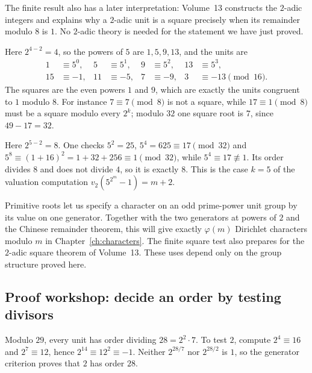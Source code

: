 The finite result also has a later interpretation: Volume~13 constructs the $2$-adic integers and explains why a $2$-adic unit is a square precisely when its remainder modulo $8$ is $1$. No $2$-adic theory is needed for the statement we have just proved.

\begin{examplex}
Here $2^{4-2}=4$, so the powers of $5$ are $1,5,9,13$, and the units are
\[
\begin{aligned}
1&\equiv5^0,&5&\equiv5^1,&9&\equiv5^2,&13&\equiv5^3,\\
15&\equiv-1,&11&\equiv-5,&7&\equiv-9,&3&\equiv-13\pmod{16}.
\end{aligned}
\]
The squares are the even powers $1$ and $9$, which are exactly the units congruent to $1$ modulo $8$. For instance $7\equiv7\pmod8$ is not a square, while $17\equiv1\pmod8$ must be a square modulo every $2^k$; modulo $32$ one square root is $7$, since $49-17=32$.
\end{examplex}

\begin{examplex}
Here $2^{5-2}=8$. One checks $5^2=25$, $5^4=625\equiv17\pmod{32}$ and $5^8\equiv(1+16)^2=1+32+256\equiv1\pmod{32}$, while $5^4\equiv17\not\equiv1$. Its order divides $8$ and does not divide $4$, so it is exactly $8$. This is the case $k=5$ of the valuation computation $v_2(5^{2^m}-1)=m+2$.
\end{examplex}

\begin{beauty}
Primitive roots let us specify a character on an odd prime-power unit group by its value on one generator. Together with the two generators at powers of $2$ and the Chinese remainder theorem, this will give exactly $\varphi(m)$ Dirichlet characters modulo $m$ in Chapter~\ref{ch:characters}. The finite square test also prepares for the $2$-adic square theorem of Volume~13. These uses depend only on the group structure proved here.
\end{beauty}

\subsection*{Proof workshop: decide an order by testing divisors}

Modulo $29$, every unit has order dividing $28=2^2\cdot7$.
To test $2$, compute $2^4\equiv16$ and
$2^7\equiv12$, hence $2^{14}\equiv12^2\equiv-1$.
Neither $2^{28/7}$ nor $2^{28/2}$ is $1$, so the generator
criterion proves that $2$ has order $28$.

